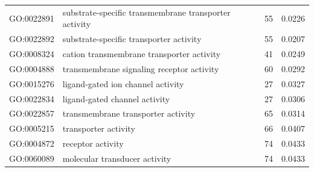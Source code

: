 \documentclass[10pt,letterpaper]{article}
\begin{document}
\begin{table}[]
\begin{tabular}{llcc}
GO:0022891                                 & substrate-specific transmembrane transporter activity      & 55                                                                                       & 0.0226                                \\
GO:0022892                                 & substrate-specific transporter activity                    & 55                                                                                       & 0.0207                                \\
GO:0008324                                 & cation transmembrane transporter activity                  & 41                                                                                       & 0.0249                                \\
GO:0004888                                 & transmembrane signaling receptor activity                  & 60                                                                                       & 0.0292                                \\
GO:0015276                                 & ligand-gated ion channel activity                          & 27                                                                                       & 0.0327                                \\
GO:0022834                                 & ligand-gated channel activity                              & 27                                                                                       & 0.0306                                \\
GO:0022857                                 & transmembrane transporter activity                         & 65                                                                                       & 0.0314                                \\
GO:0005215                                 & transporter activity                                       & 66                                                                                       & 0.0407                                \\
GO:0004872                                 & receptor activity                                          & 74                                                                                       & 0.0433                                \\
GO:0060089                                 & molecular transducer activity                              & 74                                                                                       & 0.0433                                \\

\end{tabular}
\end{table}
\end{document}

